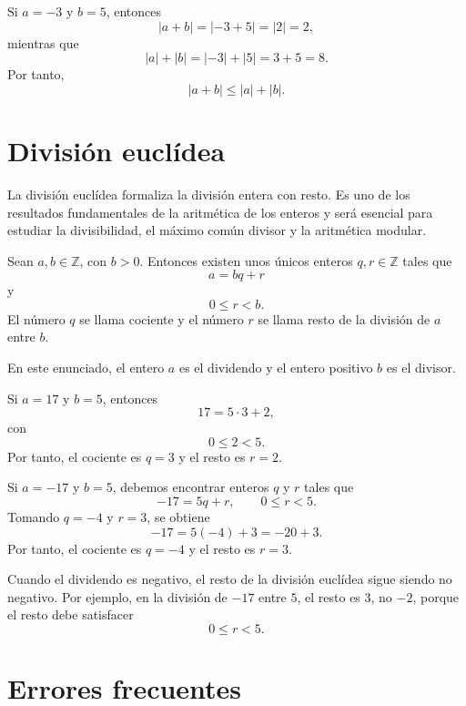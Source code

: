 \begin{ejemplo}
Si \(a=-3\) y \(b=5\), entonces
\[
  |a+b|=|-3+5|=|2|=2,
\]
mientras que
\[
  |a|+|b|=|-3|+|5|=3+5=8.
\]
Por tanto,
\[
  |a+b|\leq |a|+|b|.
\]
\end{ejemplo}

\section{División euclídea}

La división euclídea formaliza la división entera con resto. Es uno de los resultados fundamentales de la aritmética de los enteros y será esencial para estudiar la divisibilidad, el máximo común divisor y la aritmética modular.

\begin{teorema}
Sean \(a,b\in\mathbb{Z}\), con \(b>0\). Entonces existen unos únicos enteros \(q,r\in\mathbb{Z}\) tales que
\[
  a=bq+r
\]
y
\[
  0\leq r<b.
\]
El número \(q\) se llama cociente y el número \(r\) se llama resto de la división de \(a\) entre \(b\).
\end{teorema}

En este enunciado, el entero \(a\) es el dividendo y el entero positivo \(b\) es el divisor.

\begin{ejemplo}
Si \(a=17\) y \(b=5\), entonces
\[
  17=5\cdot 3+2,
\]
con
\[
  0\leq 2<5.
\]
Por tanto, el cociente es \(q=3\) y el resto es \(r=2\).
\end{ejemplo}

\begin{ejemplo}
Si \(a=-17\) y \(b=5\), debemos encontrar enteros \(q\) y \(r\) tales que
\[
  -17=5q+r,
  \qquad
  0\leq r<5.
\]
Tomando \(q=-4\) y \(r=3\), se obtiene
\[
  -17=5(-4)+3=-20+3.
\]
Por tanto, el cociente es \(q=-4\) y el resto es \(r=3\).
\end{ejemplo}

\begin{advertencia}
Cuando el dividendo es negativo, el resto de la división euclídea sigue siendo no negativo. Por ejemplo, en la división de \(-17\) entre \(5\), el resto es \(3\), no \(-2\), porque el resto debe satisfacer
\[
  0\leq r<5.
\]
\end{advertencia}

\section*{Errores frecuentes}

